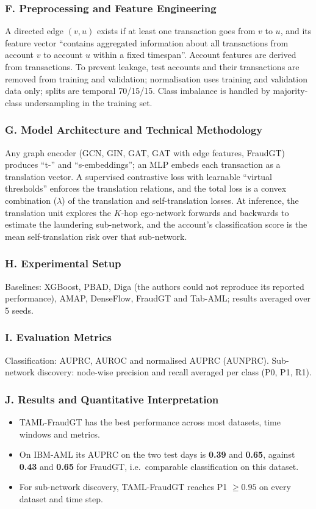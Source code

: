 \documentclass[11pt,a4paper]{article}
\begin{document}
\subsubsection*{F. Preprocessing and Feature Engineering}
A directed edge $(v,u)$ exists if at least one transaction goes from $v$ to $u$, and its feature vector ``contains aggregated information about all transactions from account $v$ to account $u$ within a fixed timespan''. Account features are derived from transactions. To prevent leakage, test accounts and their transactions are removed from training and validation; normalisation uses training and validation data only; splits are temporal 70/15/15. Class imbalance is handled by majority-class undersampling in the training set.

\subsubsection*{G. Model Architecture and Technical Methodology}
Any graph encoder (GCN, GIN, GAT, GAT with edge features, FraudGT) produces ``t-'' and ``s-embeddings''; an MLP embeds each transaction as a translation vector. A supervised contrastive loss with learnable ``virtual thresholds'' enforces the translation relations, and the total loss is a convex combination ($\lambda$) of the translation and self-translation losses. At inference, the translation unit explores the $K$-hop ego-network forwards and backwards to estimate the laundering sub-network, and the account's classification score is the mean self-translation risk over that sub-network.

\subsubsection*{H. Experimental Setup}
Baselines: XGBoost, PBAD, Diga (the authors could not reproduce its reported performance), AMAP, DenseFlow, FraudGT and Tab-AML; results averaged over 5 seeds.

\subsubsection*{I. Evaluation Metrics}
Classification: AUPRC, AUROC and normalised AUPRC (AUNPRC). Sub-network discovery: node-wise precision and recall averaged per class (P0, P1, R1).

\subsubsection*{J. Results and Quantitative Interpretation}
\begin{itemize}[leftmargin=*]
    \item TAML-FraudGT has the best performance across most datasets, time windows and metrics.
    \item On IBM-AML its AUPRC on the two test days is \textbf{0.39} and \textbf{0.65}, against \textbf{0.43} and \textbf{0.65} for FraudGT, i.e.\ comparable classification on this dataset.
    \item For sub-network discovery, TAML-FraudGT reaches P1 $\geq 0.95$ on every dataset and time step.
\end{itemize}
\end{document}

